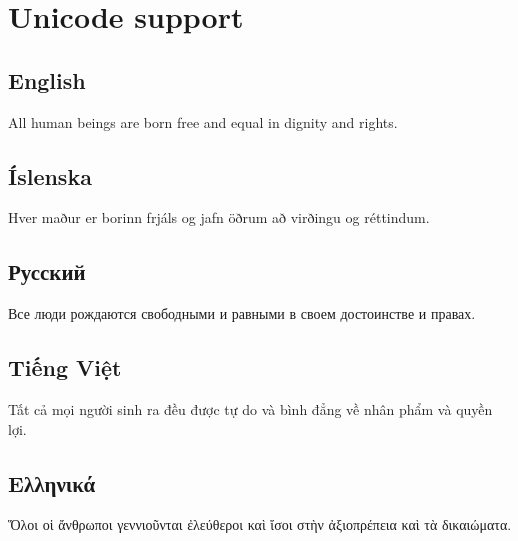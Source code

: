 \documentclass[11pt]{article}
\begin{document}
\section{Unicode support}
 
\subsection{English}
All human beings are born free and equal in dignity and rights.
 
\subsection{Íslenska}
Hver maður er borinn frjáls og jafn öðrum að virðingu og réttindum.
 
\subsection{Русский}  
Все люди рождаются свободными и равными в своем достоинстве и 
правах.
 
\subsection{Tiếng Việt}
Tất cả mọi người sinh ra đều được tự do và bình đẳng về nhân phẩm và 
quyền lợi.
 
\subsection{Ελληνικά} 
Ὅλοι οἱ ἄνθρωποι γεννιοῦνται ἐλεύθεροι καὶ ἴσοι στὴν ἀξιοπρέπεια 
καὶ τὰ δικαιώματα.
\end{document}
